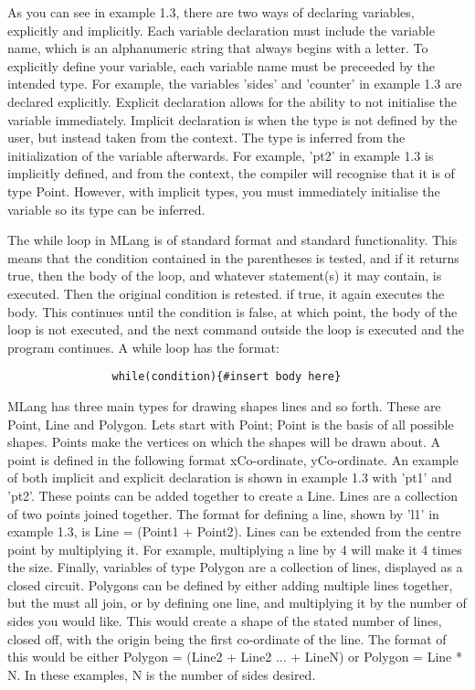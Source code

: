\documentclass{l3proj}
\begin{document}
As you can see in example 1.3, there are two ways of declaring variables, explicitly and implicitly. Each variable declaration must include the variable name, which is an alphanumeric string that always begins with a letter. To explicitly define your variable, each variable name must be preceeded by the intended type. For example, the variables 'sides' and 'counter' in example 1.3 are declared explicitly. Explicit declaration allows for the ability to not initialise the variable immediately. Implicit declaration is when the type is not defined by the user, but instead taken from the context. The type is inferred from the initialization of the variable afterwards. For example, 'pt2' in example 1.3 is implicitly defined, and from the context, the compiler will recognise that it is of type Point. However, with implicit types, you must immediately initialise the variable so its type can be inferred.

The while loop in MLang is of standard format and standard functionality. This means that the condition contained in the parentheses is tested, and if it returns true, then the body of the loop, and whatever statement(s) it may contain, is executed. Then the original condition is retested. if true, it again executes the body. This continues until the condition is false, at which point, the body of the loop is not executed, and the next command outside the loop is executed and the program continues. A while loop has the format: \begin{lstlisting}
				while(condition){#insert body here} 
		\end{lstlisting}

MLang has three main types for drawing shapes lines and so forth. These are Point, Line and Polygon. Lets start with Point; Point is the basis of all possible shapes. Points make the vertices on which the shapes will be drawn about. A point is defined in the following format {xCo-ordinate, yCo-ordinate}. An example of both implicit and explicit declaration is shown in example 1.3 with 'pt1' and 'pt2'. These points can be added together to create a Line. Lines are a collection of two points joined together. The format for defining a line, shown by 'l1' in example 1.3, is Line = (Point1 + Point2). Lines can be extended from the centre point by multiplying it. For example, multiplying a line by 4 will make it 4 times the size. Finally, variables of type Polygon are a collection of lines, displayed as a closed circuit. Polygons can be defined by either adding multiple lines together, but the must all join, or by defining one line, and multiplying it by the number of sides you would like. This would create a shape of the stated number of lines, closed off, with the origin being the first co-ordinate of the line. The format of this would be either Polygon = (Line2 + Line2 ... + LineN) or Polygon = Line * N. In these examples, N is the number of sides desired.
\end{document}
